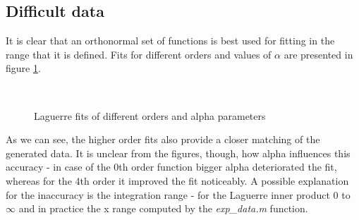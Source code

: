 \documentclass[a4paper]{article}
\numberwithin{equation}{section}
\begin{document}
\subsection{Difficult data}
It is clear that an orthonormal set of functions is best used for fitting in the range that it is defined. Fits for different orders and values of $\alpha$ are presented in figure \ref{fig:difficultfits}.

\begin{figure}[!ht]
  \centering
  \quad
  \\
  \quad
  \caption{Laguerre fits of different orders and alpha parameters}
  \label{fig:difficultfits}
\end{figure}

\noindent As we can see, the higher order fits also provide a closer matching of the generated data. It is unclear from the figures, though, how alpha influences this accuracy - in case of the 0th order function bigger alpha deteriorated the fit, whereas for the 4th order it improved the fit noticeably. A possible explanation for the inaccuracy is the integration range - for the Laguerre inner product $0$ to $\infty$ and in practice the x range computed by the \textit{exp\_data.m} function.\\
\end{document}
